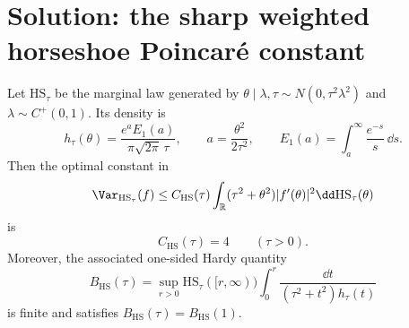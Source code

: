 \documentclass[../main.tex]{subfiles}
\begin{document}

\section*{Solution: the sharp weighted horseshoe Poincar\'e constant}
\label{sec:sol-prop-a3-horseshoe}

\begin{theorem}
\label{thm:sol-prop-a3-horseshoe}
Let $\mathrm{HS}_\tau$ be the marginal law generated by
$\theta\mid\lambda,\tau\sim N(0,\tau^2\lambda^2)$ and
$\lambda\sim C^+(0,1)$.  Its density is
\[
 h_\tau(\theta)
 =\frac{e^aE_1(a)}{\pi\sqrt{2\pi}\,\tau},
 \qquad
 a=\frac{\theta^2}{2\tau^2},
 \qquad
 E_1(a)=\int_a^\infty\frac{e^{-s}}s\,\dd s .
\]
Then the optimal constant in
\[
 \Var_{\mathrm{HS}_\tau}(f)
 \le C_{\mathrm{HS}}(\tau)
 \int_{\mathbb R}(\tau^2+\theta^2)|f'(\theta)|^2
       \dd\mathrm{HS}_\tau(\theta)
\]
is
\[
 C_{\mathrm{HS}}(\tau)=4
 \qquad(\tau>0).
\]
Moreover, the associated one-sided Hardy quantity
\[
 B_{\mathrm{HS}}(\tau)
 =\sup_{r>0}\mathrm{HS}_\tau([r,\infty))
   \int_0^r\frac{\dd t}{(\tau^2+t^2)h_\tau(t)}
\]
is finite and satisfies $B_{\mathrm{HS}}(\tau)=B_{\mathrm{HS}}(1)$.
\end{theorem}
\end{document}

